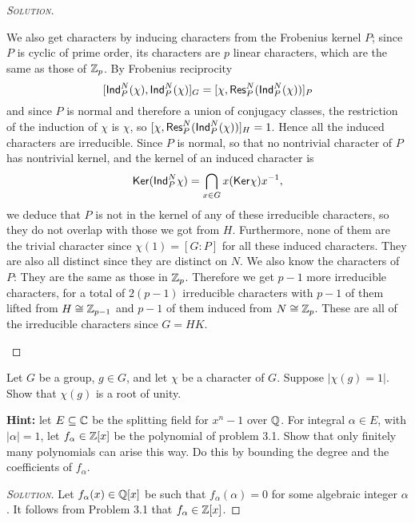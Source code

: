 \begin{proof}[{\scshape Solution}]
\begin{enumerate}[font=\normalfont,label=\textbf{(\Alph*)}, wide]
We also get characters by inducing characters from the Frobenius kernel $P$; since $P$ is cyclic of prime order, its characters are $p$ linear characters, which are the same as those of $\mathbb{Z}_p$. By Frobenius reciprocity
\[
  [\mathsf{Ind}^N_P(\chi), \mathsf{Ind}^N_P(\chi)]_G = [\chi, \mathsf{Res}^N_P(\mathsf{Ind}^N_P(\chi))]_P
\]
and since $P$ is normal and therefore a union of conjugacy classes, the restriction of the induction of $\chi$ is $\chi$, so $[\chi, \mathsf{Res}^N_P(\mathsf{Ind}^N_P(\chi))]_H = 1$. Hence all the induced characters are irreducible. Since $P$ is normal, so that no nontrivial character of $P$ has nontrivial kernel, and the kernel of an induced character is
 \[
    \mathsf{Ker} (\mathsf{Ind}^N_P\chi) = \bigcap_{x\in G}x(\mathsf{Ker}\chi)x^{-1},
 \]
we deduce that $P$ is not in the kernel of any of these irreducible characters, so they do not overlap with those we got from $H$. Furthermore, none of them are the trivial character since $\chi(1) = [G:P]$ for all these induced characters. They are also all distinct since they are distinct on $N$. We also know the characters of $P$: They are the same as those in $\mathbb{Z}_p$. Therefore we get $p-1$ more irreducible characters, for a total of $2(p-1)$ irreducible characters with $p-1$ of them lifted from $H \cong \mathbb{Z}_{p-1}$ and $p-1$ of them induced from $N \cong \mathbb{Z}_p$. These are all of the irreducible characters since $G = HK$.

  \end{enumerate}
\end{proof}

\newpage

\begin{problem}[Isaacs 3.2]
Let $G$ be a group, $g \in G$, and let $\chi$ be a character of $G$. Suppose $\lvert \chi(g) = 1 \rvert$. Show that $\chi(g)$ is a root of unity.

\noindent\textbf{Hint:} let $E \subseteq \mathbb{C}$ be the splitting field for $x^n-1$ over $\mathbb{Q}$. For integral $\alpha \in E$, with $\lvert \alpha \rvert = 1$, let $f_\alpha \in \mathbb{Z}[x]$ be the polynomial of problem 3.1. Show that only finitely many polynomials can arise this way. Do this by bounding the degree and the coefficients of $f_\alpha$.
\end{problem}

\begin{proof}[{\scshape Solution}]
Let $f_\alpha(x) \in \mathbb{Q}[x]$ be such that $f_\alpha(\alpha) = 0$ for some algebraic integer $\alpha$. It follows from Problem 3.1 that $f_\alpha \in \mathbb{Z}[x]$.
\end{proof}

\newpage

